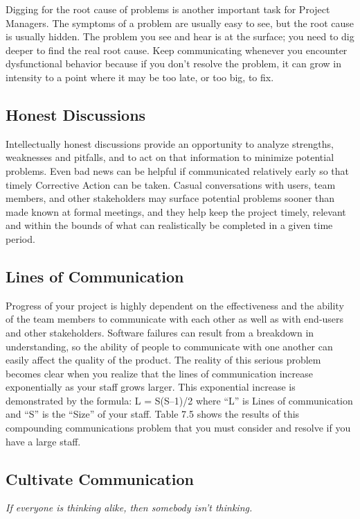 \documentclass{book}
\begin{document}
Digging for the root cause of problems is another important
task for Project Managers. The symptoms of a problem
are usually easy to see, but the root cause is usually hidden.
The problem you see and hear is at the surface; you need to
dig deeper to find the real root cause. Keep communicating
whenever you encounter dysfunctional behavior because if
you don’t resolve the problem, it can grow in intensity to a
point where it may be too late, or too big, to fix.

\subsection{Honest Discussions}

Intellectually honest discussions provide an opportunity to
analyze strengths, weaknesses and pitfalls, and to act on
that information to minimize potential problems. Even bad
news can be helpful if communicated relatively early so that
timely Corrective Action can be taken. Casual conversations
with users, team members, and other stakeholders may surface
potential problems sooner than made known at formal
meetings, and they help keep the project timely, relevant and
within the bounds of what can realistically be completed in
a given time period.

\subsection{Lines of Communication}
Progress of your project is highly dependent on the effectiveness
and the ability of the team members to communicate
with each other as well as with end-users and other stakeholders.
Software failures can result from a breakdown in understanding,
so the ability of people to communicate with one
another can easily affect the quality of the product. The reality
of this serious problem becomes clear when you realize
that the lines of communication increase exponentially as your
staff grows larger. This exponential increase is demonstrated
by the formula:
L = S(S–1)/2 where “L” is Lines of communication and “S”
is the “Size” of your staff.
Table 7.5 shows the results of this compounding communications
problem that you must consider and resolve if
you have a large staff.

\subsection{Cultivate Communication}

\textit{If everyone is thinking alike, then somebody isn’t
thinking.}
\end{document}
